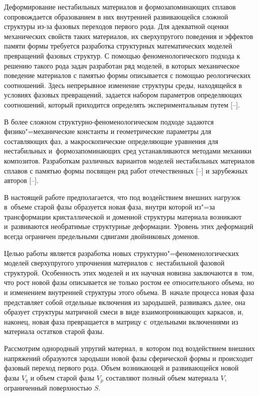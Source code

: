 Деформирование нестабильных материалов и формозапоминающих сплавов сопровождается образованием в них внутренней развивающейся сложной структуры из-за фазовых переходов первого рода. Для адекватной оценки механических свойств таких материалов, их сверхупругого поведения и эффектов памяти формы требуется разработка структурных математических моделей превращений фазовых структур. С помощью феноменологического подхода к решению такого рода задач разработан ряд моделей, в которых механическое поведение материалов с памятью формы описывается с помощью реологических соотношений. Здесь непрерывное изменение структуры среды, находящейся в условиях фазовых превращений, задается набором параметров определяющих соотношений, который приходится определять экспериментальным путем [--].

В более сложном структурно-феноменологическом подходе задаются фи\-зи\-ко"=механические константы и геометрические параметры для составляющих фаз, а макроскопические определяющие уравнения для нестабильных и~формозапоминающих сред устанавливаются методами механики композитов. Разработкам различных вариантов моделей нестабильных материалов сплавов с памятью формы посвящен ряд работ отечественных [--] и зарубежных авторов [--]. 

В настоящей работе предполагается, что под воздействием внешних нагрузок в~объеме старой фазы образуется новая фаза, внутри которой из"=за трансформации кристаллической и доменной структуры материала возникают и~развиваются необратимые структурные деформации. Уровень этих деформаций всегда ограничен предельными сдвигами двойниковых доменов.

Целью работы является разработка новых структурно"=феноменологических моделей сверхупругого упрочнения материалов с~нестабильной фазовой структурой. Особенность этих моделей и их научная новизна заключаются в~том, что рост новой фазы описывается не только ростом ее относительного объема, но и изменением внутренней структуры этого объема. 
В~начале процесса новая фаза представляет собой отдельные включения из зародышей, развиваясь далее, она образует структуры матричной смеси в виде взаимопроникающих каркасов, и, наконец, новая фаза превращается в матрицу с~отдельными включениями из материала остатков старой фазы.


\smallskip

Рассмотрим однородный упругий материал, в~котором под воздействием внешних напряжений образуются зародыши новой фазы сферической формы и происходит фазовый переход первого рода. 
Объем возникающей и развивающейся новой фазы $V_{q}$  и объем старой фазы $V_{p}$  составляют полный объем материала $V$, ограниченный поверхностью $S$.

